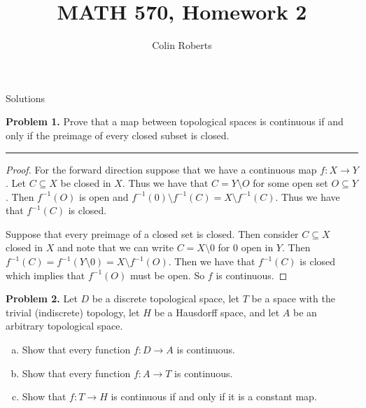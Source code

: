 \documentclass[leqno]{article}
\author{Colin Roberts}
\title{MATH 570, Homework 2}
\theoremstyle{nonumberplain}
\newtheorem{proof}{Proof}
\begin{document}
\maketitle
\begin{large}
\begin{center}
Solutions
\end{center}
\end{large}
\pagebreak


\noindent\textbf{Problem 1.} Prove that a map between topological spaces is continuous if and only if the preimage of every closed subset is closed.

\noindent\rule[0.5ex]{\linewidth}{1pt}

\begin{proof}
For the forward direction suppose that we have a continuous map $f\colon X\to Y$.  Let $C\subseteq X$ be closed in $X$.  Thus we have that $C=Y\setminus O$ for some open set $O\subseteq Y$.  Then $f^{-1}(O)$ is open and $f^{-1}(0)\setminus f^{-1}(C)=X\setminus f^{-1}(C)$.  Thus we have that $f^{-1}(C)$ is closed.

Suppose that every preimage of a closed set is closed.  Then consider $C\subseteq X$ closed in $X$ and note that we can write $C=X\setminus 0$ for $0$ open in $Y$.  Then $f^{-1}(C)=f^{-1}(Y\setminus 0)=X\setminus f^{-1}(O)$.  Then we have that $f^{-1}(C)$ is closed which implies that $f^{-1}(O)$ must be open.  So $f$ is continuous.
\end{proof}

\pagebreak



\noindent\textbf{Problem 2.} Let $D$ be a discrete topological space, let $T$ be a space with the trivial (indiscrete) topology, let $H$ be a Hausdorff space, and let $A$ be an arbitrary topological space.
\begin{enumerate}[(a)]
\item Show that every function $f \colon D\to A$ is continuous.
\item Show that every function $f\colon A \to T$ is continuous.
\item Show that $f\colon T\to H$ is continuous if and only if it is a constant map.
\end{enumerate}
\end{document}
